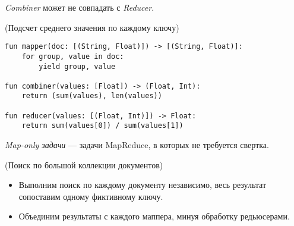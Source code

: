 \begin{remark}
    \textit{Combiner} может не совпадать с \textit{Reducer}.
\end{remark}

\begin{example}(Подсчет среднего значения по каждому ключу)
  \begin{lstlisting}
fun mapper(doc: [(String, Float)]) -> [(String, Float)]:
    for group, value in doc:
        yield group, value

fun combiner(values: [Float]) -> (Float, Int):
    return (sum(values), len(values))

fun reducer(values: [(Float, Int)]) -> Float:
    return sum(values[0]) / sum(values[1])
  \end{lstlisting}
\end{example}

\begin{definition}
  \textit{Map-only задачи} --- задачи MapReduce, в которых не требуется свертка.
\end{definition}

\begin{example}(Поиск по большой коллекции документов)
  \begin{itemize}
    \item Выполним поиск по каждому документу независимо, весь результат
      сопоставим одному фиктивному ключу.
    \item Объединим результаты с каждого маппера, минуя обработку редьюсерами.
  \end{itemize}
\end{example}
